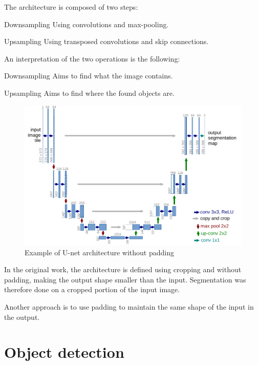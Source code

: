 The architecture is composed of two steps:
\begin{descriptionlist}
    \item[Downsampling] Using convolutions and max-pooling.
    \item[Upsampling] Using transposed convolutions and skip connections.
\end{descriptionlist}

\begin{remark}
    An interpretation of the two operations is the following:
    \begin{descriptionlist}
        \item[Downsampling] Aims to find what the image contains.
        \item[Upsampling] Aims to find where the found objects are.
    \end{descriptionlist}
\end{remark}

\begin{figure}[H]
    \centering
    \includegraphics[width=0.75\linewidth]{./img/_unet.pdf}
    \caption{Example of U-net architecture without padding}
\end{figure}

\begin{remark}
    In the original work, the architecture is defined using cropping and without padding, making the output shape smaller than the input.
    Segmentation was therefore done on a cropped portion of the input image.

    Another approach is to use padding to maintain the same shape of the input in the output.
\end{remark}



\section{Object detection}

